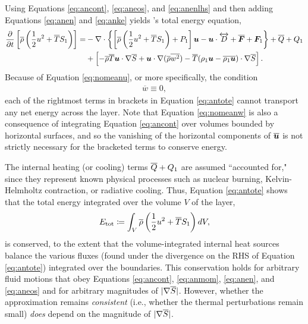 \documentclass[12pt]{article}
\newcommand{\vecf}{\bm{F}}
\begin{document}
Using Equations \eqref{eq:ancont}, \eqref{eq:aneos}, and \eqref{eq:anenlhs} and then adding Equations \eqref{eq:anen} and \eqref{eq:anke} yields \citet{Gough1969}'s total energy equation,
\begin{align}\label{eq:antote}
			\pderiv{}{t}\left[\rhoover\left(\frac{1}{2} u^2 + \tmpover \entrone\right)\right] = &-\Div\left\{\left[\rhoover\left(\frac{1}{2} u^2 + \tmpover \entrone\right) + \prsone\right]\vecu- \vecu\cdot\overleftrightarrow{D} + \overline{\vecf} + \vecf_1\right\}+ \heatover + Q_1 \nonumber\\
			 &+\left[-\rhoover\tmpover\ugrad\entrover +\ugrad (\rhoover \overline{w^2})- \tmpover(\rhoone\vecu-\overline{\rhoone\vecu})\cdot\nabla\entrover\right].
\end{align}
Because of Equation \eqref{eq:nomeanu}, or more specifically, the condition
\begin{align}\label{eq:nomeanw}
	\overline{w}\equiv0,
\end{align}
 each of the rightmost terms in brackets in Equation \eqref{eq:antote} cannot transport any net energy across the layer. Note that Equation \eqref{eq:nomeanw} is also a consequence of integrating Equation \eqref{eq:ancont} over volumes bounded by horizontal surfaces, and so the vanishing of the horizontal components of $\overline{\bm{u}}$ is not strictly necessary for the bracketed terms to conserve energy. 
 
 The internal heating (or cooling) terms $\overline{Q} + Q_1$ are assumed ``accounted for," since they represent known physical processes such as nuclear burning, Kelvin-Helmholtz contraction, or radiative cooling. Thus, Equation \eqref{eq:antote} shows that the total energy integrated over the volume $V$ of the layer,
\begin{align}\label{eq:deftote}
	E_{\rm tot} \coloneqq \int_V \overline{\rho}\left(\frac{1}{2} u^2 + \overline{T} S_1\right) dV,
\end{align}
is conserved, to the extent that the volume-integrated internal heat sources balance the various fluxes (found under the divergence on the RHS of Equation \eqref{eq:antote}) integrated over the boundaries. This conservation holds for arbitrary fluid motions that obey Equations \eqref{eq:ancont}, \eqref{eq:anmom}, \eqref{eq:anen}, and \eqref{eq:aneos} and for arbitrary magnitudes of $|\nabla \overline{S}|$. However, whether the approximation remains \textit{consistent} (i.e., whether the thermal perturbations remain small) \textit{does} depend on the magnitude of $|\nabla\overline{S}|$.
\end{document}
